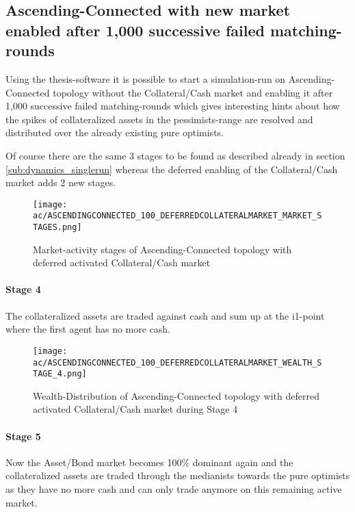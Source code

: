 \documentclass[Bachelorarbeit.tex]{subfiles}
\begin{document}
\subsection{Ascending-Connected with new market enabled after 1,000 successive failed matching-rounds}
Using the thesis-software it is possible to start a simulation-run on Ascending-Connected topology without the Collateral/Cash market and enabling it after 1,000 successive failed matching-rounds which gives interesting hints about how the spikes of collateralized assets in the pessimists-range are resolved and distributed over the already existing pure optimists.

\medskip

Of course there are the same 3 stages to be found as described already in section \ref{sub:dynamics_singlerun} whereas the deferred enabling of the Collateral/Cash market adds 2 new stages.

\begin{figure}[H]
	\centering
  \texttt{[image: ac/ASCENDINGCONNECTED\_100\_DEFERREDCOLLATERALMARKET\_MARKET\_STAGES.png]}
  	\caption{Market-activity stages of Ascending-Connected topology with deferred activated Collateral/Cash market}
	\label{fig:markets_ASCENDINGCONNECTED_100_DEFERREDCOLLATERALMARKET_MARKET_STAGES}
\end{figure}

\paragraph{Stage 4}
The collateralized assets are traded against cash and sum up at the i1-point where the first agent has no more cash. 

\begin{figure}[H]
	\centering
  \texttt{[image: ac/ASCENDINGCONNECTED\_100\_DEFERREDCOLLATERALMARKET\_WEALTH\_STAGE\_4.png]}
  	\caption{Wealth-Distribution of Ascending-Connected topology with deferred activated Collateral/Cash market during Stage 4}
	\label{fig:markets_ASCENDINGCONNECTED_100_DEFERREDCOLLATERALMARKET_WEALTH_STAGE_4}
\end{figure}

\paragraph{Stage 5}
Now the Asset/Bond market becomes 100\% dominant again and the collateralized assets are traded through the medianists towards the pure optimists as they have no more cash and can only trade anymore on this remaining active market.
\end{document}
